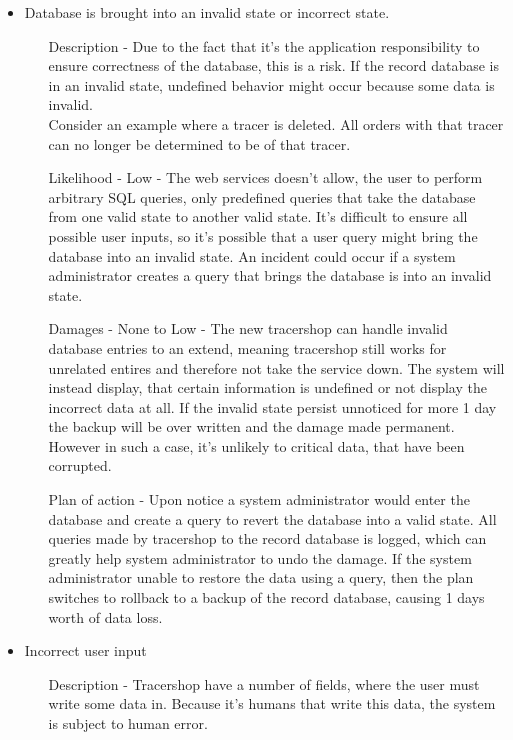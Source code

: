 \documentclass{article}
\begin{document}
\begin{itemize}
\begin{itemize}
  \end{itemize}
  \item Database is brought into an invalid state or incorrect state.
  \begin{itemize}
    \item[Description] - Due to the fact that it's the application responsibility to ensure correctness of the database, this is a risk.
    If the record database is in an invalid state, undefined behavior might occur because some data is invalid.\\
    Consider an example where a tracer is deleted. All orders with that tracer can no longer be determined to be of that tracer.
    \item[Likelihood] - Low - The web services doesn't allow, the user to perform arbitrary SQL queries,
    only predefined queries that take the database from one valid state to another valid state.
    It's difficult to ensure all possible user inputs, so it's possible that a user query might bring the database into an invalid state.
    An incident could occur if a system administrator creates a query that brings the database is into an invalid state.
    \item[Damages] - None to Low - The new tracershop can handle invalid database entries to an extend,
    meaning tracershop still works for unrelated entires and therefore not take the service down.
    The system will instead display, that certain information is undefined or not display the incorrect data at all.
    If the invalid state persist unnoticed for more 1 day the backup will be over written and the damage made permanent.
    However in such a case, it's unlikely to critical data, that have been corrupted.
    \item[Plan of action] - Upon notice a system administrator would enter the database and create a query to revert the database into a valid state.
    All queries made by tracershop to the record database is logged,
    which can greatly help system administrator to undo the damage.
    If the system administrator unable to restore the data using a query, then the plan switches to rollback to a backup of the record database, causing 1 days worth of data loss.
  \end{itemize}
  \item Incorrect user input
  \begin{itemize}
    \item[Description] - Tracershop have a number of fields, where the user must write some data in. Because it's humans that write this data, the system is subject to human error.

\end{itemize}
\end{itemize}
\end{document}

